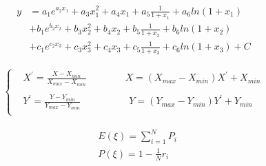 \documentclass{article}
\begin{document}
	\begin{equation}
	\begin{split}
	y&=a_{1}e^{a_{2}x_{1}}+a_{3}x_{1}^{2}+a_{4}x_{1}
	+a_{5}\frac{1}{1+x_{1}}+a_{6}ln(1+x_{1})\\
	&+b_{1}e^{b_{2}x_{2}}+b_{3}x_{2}^{2}+b_{4}x_{2}
	+b_{5}\frac{1}{1+x_{2}}+b_{6}ln(1+x_{2})\\
	&+c_{1}e^{c_{2}x_{3}}+c_{3}x_{3}^{2}+c_{4}x_{3}
	+c_{5}\frac{1}{1+x_{3}}+c_{6}ln(1+x_{3})+C
	\end{split}
	\end{equation}
	
		
	\begin{equation}
	\begin{split}
	\begin{cases}
		&X^{'}=\frac{X-X_{min}}{X_{max}-X_{min}}\qquad\qquad X=(X_{max}-X_{min})X^{'}+X_{min}\\
		&\\
		&Y^{'}=\frac{Y-Y_{min}}{Y_{max}-Y_{min}}\qquad\qquad\quad 
		Y =(Y_{max}-Y_{min})Y^{'}+Y_{min}\\
	\end{cases}
	\end{split}
	\end{equation}
	
	\begin{equation}
	\begin{split}
	&E(\xi)=\sum_{i=1}^{N}P_{i}\\
	&P(\xi)=1-\frac{1}{N}r_{i}
	\end{split}		
	\end{equation}
\end{document}
